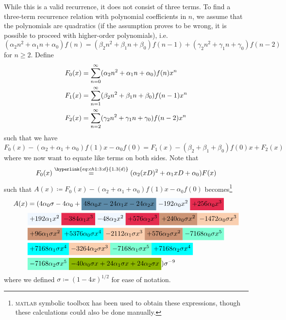 \begin{solution}
While this is a valid recurrence, it does not consist of three terms. To find a three-term recurrence relation with polynomial coefficients in $n$, we assume that the polynomials are quadratics (if the assumption proves to be wrong, it is possible to proceed with higher-order polynomials), i.e.
\[
    (\alpha_2n^2 + \alpha_1n + \alpha_0)f(n) = (\beta_2n^2 + \beta_1n + \beta_0) f(n-1) + (\gamma_2 n^2 + \gamma_1n + \gamma_0)f(n-2)
\]
for $n\geq 2$. Define
\begin{align*}
    F_0(x) &= \sum_{n=0}^\infty (\alpha_2 n^2 + \alpha_1n + \alpha_0) f(n) x^n \\
    F_1(x) &= \sum_{n=1}^\infty (\beta_2n^2 + \beta_1n + \beta_0) f(n-1) x^n  \\
    F_2(x) &= \sum_{n=2}^\infty(\gamma_2 n^2 + \gamma_1n + \gamma_0)f(n-2) x^n 
\end{align*}
such that we have
\[
    F_0(x) - (\alpha_2 + \alpha_1 + \alpha_0) f(1)x - \alpha_0 f(0) = F_1(x) - (\beta_2 + \beta_1 + \beta_0) f(0)x + F_2(x)
\]
where we now want to equate like terms on both sides. Note that
\[
    F_0(x) \estep{\hyperlink{eq:ch1:3:d}{1.3(d)}} (\alpha_2 (xD)^2 + \alpha_1 xD + \alpha_0) F(x)
\]
such that $A(x) \coloneq F_0(x) - (\alpha_2 + \alpha_1 + \alpha_0) f(1)x - \alpha_0 f(0)$ becomes\footnote{\textsc{matlab} symbolic toolbox has been used to obtain these expressions, though these calculations could also be done manually.}
\begin{align*}
    A(x) &= (4\alpha_0\sigma - 4\alpha_0 + \hl{airforceblue}{48\alpha_0x - 24\alpha_1x - 24\alpha_2x}\hl{aliceblue}{ - 192\alpha_0x^2}\hl{amaranth}{ + 256\alpha_0x^3} \\
    &\hl{aliceblue}{+ 192\alpha_1x^2}\hl{amaranth}{ - 384\alpha_1x^3 }\hl{aliceblue}{- 48\alpha_2x^2}\hl{amaranth}{ + 576\alpha_2x^3 }\hl{antiquebrass}{+ 240\alpha_0\sigma x^2}\hl{apricot}{ - 1472\alpha_0\sigma x^3} \\
    &\hl{antiquebrass}{+ 96\alpha_1\sigma x^2}\hl{aqua}{ + 5376\alpha_0\sigma x^4} \hl{apricot}{- 2112\alpha_1\sigma x^3} \hl{antiquebrass}{+ 576\alpha_2\sigma x^2} \hl{aquamarine}{- 7168\alpha_0\sigma x^5} \\
    &\hl{aqua}{ + 7168\alpha_1\sigma x^4} \hl{apricot}{- 3264\alpha_2\sigma x^3} \hl{aquamarine}{- 7168\alpha_1\sigma x^5} \hl{aqua}{+ 7168\alpha_2\sigma x^4} \\
    &\hl{aquamarine}{- 7168\alpha_2\sigma x^5} \hl{applegreen}{- 40\alpha_0\sigma x + 24\alpha_1\sigma x + 24\alpha_2\sigma x} ) \sigma^{-9}
\end{align*}
where we defined $\sigma \coloneq (1-4x)^{1/2}$ for ease of notation.


\end{solution}
